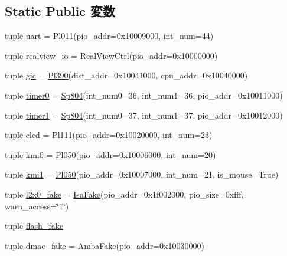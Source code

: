 \subsection*{Static Public 変数}
\begin{DoxyCompactItemize}
\item 
tuple \hyperlink{classRealView_1_1RealViewEB_a1f69fbabd17d6bca63f97f9754247cfd}{uart} = \hyperlink{classRealView_1_1Pl011}{Pl011}(pio\_\-addr=0x10009000, int\_\-num=44)
\item 
tuple \hyperlink{classRealView_1_1RealViewEB_a54d7e0216558aeb12a980d61e36094da}{realview\_\-io} = \hyperlink{classRealView_1_1RealViewCtrl}{RealViewCtrl}(pio\_\-addr=0x10000000)
\item 
tuple \hyperlink{classRealView_1_1RealViewEB_a40243beb62d217c3a9e35801ae739fd0}{gic} = \hyperlink{classPl390}{Pl390}(dist\_\-addr=0x10041000, cpu\_\-addr=0x10040000)
\item 
tuple \hyperlink{classRealView_1_1RealViewEB_af4ebf9ec12f4c51e9fd2eee3647a3932}{timer0} = \hyperlink{classRealView_1_1Sp804}{Sp804}(int\_\-num0=36, int\_\-num1=36, pio\_\-addr=0x10011000)
\item 
tuple \hyperlink{classRealView_1_1RealViewEB_a43a269dacabf237422bf29f79e52a7e5}{timer1} = \hyperlink{classRealView_1_1Sp804}{Sp804}(int\_\-num0=37, int\_\-num1=37, pio\_\-addr=0x10012000)
\item 
tuple \hyperlink{classRealView_1_1RealViewEB_aca2e883cdc9c636e4500344d5892f6c9}{clcd} = \hyperlink{classRealView_1_1Pl111}{Pl111}(pio\_\-addr=0x10020000, int\_\-num=23)
\item 
tuple \hyperlink{classRealView_1_1RealViewEB_a4fcef88eafab200d46609dff412add24}{kmi0} = \hyperlink{classRealView_1_1Pl050}{Pl050}(pio\_\-addr=0x10006000, int\_\-num=20)
\item 
tuple \hyperlink{classRealView_1_1RealViewEB_ad2ff68a98564bfc794ffe30ecd80da6c}{kmi1} = \hyperlink{classRealView_1_1Pl050}{Pl050}(pio\_\-addr=0x10007000, int\_\-num=21, is\_\-mouse=True)
\item 
tuple \hyperlink{classRealView_1_1RealViewEB_a58c42fcf23ff778110e667e2df1fbb6f}{l2x0\_\-fake} = \hyperlink{classIsaFake}{IsaFake}(pio\_\-addr=0x1f002000, pio\_\-size=0xfff, warn\_\-access=\char`\"{}1\char`\"{})
\item 
tuple \hyperlink{classRealView_1_1RealViewEB_a6dbb35031fbd3dbded6e05ca5db58c8e}{flash\_\-fake}
\item 
tuple \hyperlink{classRealView_1_1RealViewEB_acbc3f8e786184963ae1388d9d9a981be}{dmac\_\-fake} = \hyperlink{classRealView_1_1AmbaFake}{AmbaFake}(pio\_\-addr=0x10030000)

\end{DoxyCompactItemize}
